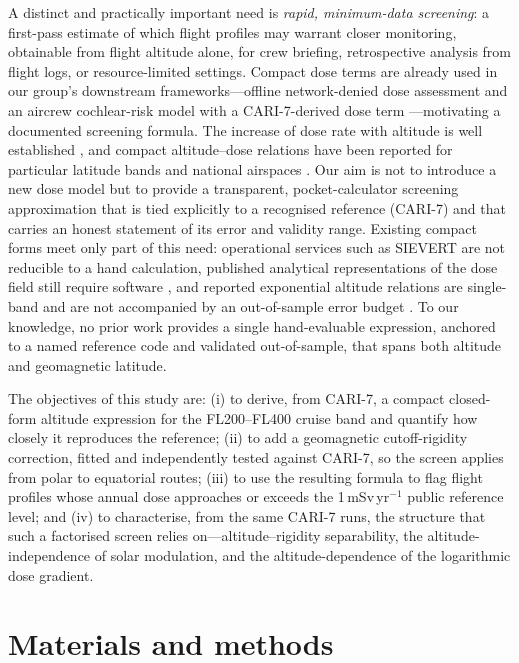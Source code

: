 \documentclass[11pt,a4paper]{article}
\begin{document}
A distinct and practically important need is \emph{rapid, minimum-data
screening}: a first-pass estimate of which flight profiles may warrant
closer monitoring, obtainable from flight altitude alone, for crew
briefing, retrospective analysis from flight logs, or resource-limited
settings. Compact dose terms are already used in our group's downstream
frameworks---offline network-denied dose assessment \citep{resil} and an
aircrew cochlear-risk model with a CARI-7-derived dose term
\citep{lee2026cochlear}---motivating a documented screening formula. The increase of dose rate with
altitude is well established \citep{lindborg2004,schraube1998}, and compact
altitude--dose relations have been reported for particular latitude bands
and national airspaces
\citep{vukovic2022,bartlett2004,zarrouk2008,makrantoni2022}. Our aim is not
to introduce a new dose
model but to provide a transparent, pocket-calculator screening
approximation that is tied explicitly to a recognised reference (CARI-7)
and that carries an honest statement of its error and validity range.
Existing compact forms meet only part of this need: operational services
such as SIEVERT are not reducible to a hand calculation, published
analytical representations of the dose field still require software
\citep{tobiska2018,meier2018}, and reported exponential altitude relations
are single-band and are not accompanied by an out-of-sample error budget
\citep{vukovic2022,bartlett2004}. To our knowledge, no prior work provides
a single hand-evaluable expression, anchored to a named reference code and
validated out-of-sample, that spans both altitude and geomagnetic
latitude.

The objectives of this study are: (i) to derive, from CARI-7, a compact
closed-form altitude expression for the FL200--FL400 cruise band and
quantify how closely it reproduces the reference; (ii) to add a
geomagnetic cutoff-rigidity correction, fitted and independently tested
against CARI-7, so the screen applies from polar to equatorial routes;
(iii) to use the resulting formula to flag flight profiles whose annual
dose approaches or exceeds the 1\,mSv\,yr$^{-1}$ public reference level; and
(iv) to characterise, from the same CARI-7 runs, the structure that such a
factorised screen relies on---altitude--rigidity separability, the
altitude-independence of solar modulation, and the altitude-dependence of
the logarithmic dose gradient.

\section{Materials and methods}
\end{document}
